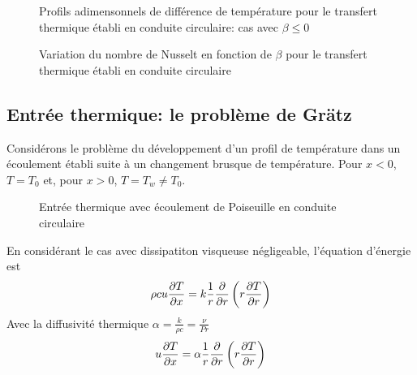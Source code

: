       \begin{figure}[!h]
        \centering
        
        \caption{Profils adimensonnels de différence de température pour le transfert thermique établi en conduite circulaire: cas avec $\beta \leq 0$}
        \label{fig:profilDiffTempPos}
      \end{figure}

      \begin{figure}[!h]
        \centering
        
        \caption{Variation du nombre de Nusselt en fonction de $\beta$ pour le transfert thermique établi en conduite circulaire}
        \label{fig:nusseltVar}
      \end{figure}

    \subsection{Entrée thermique: le problème de Grätz}
      Considérons le problème du développement d'un profil de température dans un écoulement établi suite à un changement brusque de température. Pour $x<0$, $T=T_0$ et, pour $x>0$, $T=T_w\neq T_0$.

      \begin{figure}[!h]
        \centering
        
        \caption{Entrée thermique avec écoulement de Poiseuille en conduite circulaire}
      \end{figure}

      En considérant le cas avec dissipatiton visqueuse négligeable, l'équation d'énergie est
      \begin{equation}
        \rho c u \pdv{T}{x} = k \frac{1}{r} \pdv{r}\left(r\pdv{T}{r}\right)
      \end{equation}
      Avec la diffusivité thermique $\alpha = \frac{k}{\rho c} = \frac{\nu}{Pr}$
      \begin{equation}
        u \pdv{T}{x} = \alpha \frac{1}{r} \pdv{r}\left(r\pdv{T}{r}\right)
      \end{equation}

